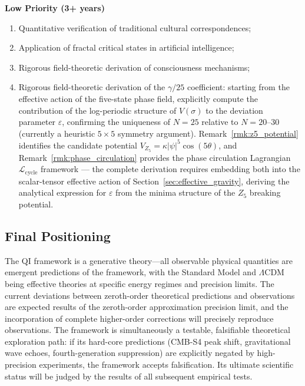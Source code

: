 \documentclass[12pt,a4paper,twocolumn]{article}
\begin{document}
\textbf{Low Priority (3+ years)}
\begin{enumerate}
\item Quantitative verification of traditional cultural correspondences;
\item Application of fractal critical states in artificial intelligence;
\item Rigorous field-theoretic derivation of consciousness mechanisms;
\item Rigorous field-theoretic derivation of the $\gamma/25$ coefficient: starting from the effective action of the five-state phase field, explicitly compute the contribution of the log-periodic structure of $V(\sigma)$ to the deviation parameter $\varepsilon$, confirming the uniqueness of $N=25$ relative to $N=20$--$30$ (currently a heuristic $5\times 5$ symmetry argument). Remark~\ref{rmk:z5_potential} identifies the candidate potential $V_{Z_5} = \kappa|\psi|^5\cos(5\theta)$, and Remark~\ref{rmk:phase_circulation} provides the phase circulation Lagrangian $\mathcal{L}_{\text{cycle}}$ framework --- the complete derivation requires embedding both into the scalar-tensor effective action of Section~\ref{sec:effective_gravity}, deriving the analytical expression for $\varepsilon$ from the minima structure of the $Z_5$ breaking potential.
\end{enumerate}

\subsection{Final Positioning}
The QI framework is a generative theory---all observable physical quantities are emergent predictions of the framework, with the Standard Model and $\Lambda$CDM being effective theories at specific energy regimes and precision limits. The current deviations between zeroth-order theoretical predictions and observations are expected results of the zeroth-order approximation precision limit, and the incorporation of complete higher-order corrections will precisely reproduce observations. The framework is simultaneously a testable, falsifiable theoretical exploration path: if its hard-core predictions (CMB-S4 peak shift, gravitational wave echoes, fourth-generation suppression) are explicitly negated by high-precision experiments, the framework accepts falsification. Its ultimate scientific status will be judged by the results of all subsequent empirical tests.
\end{document}
